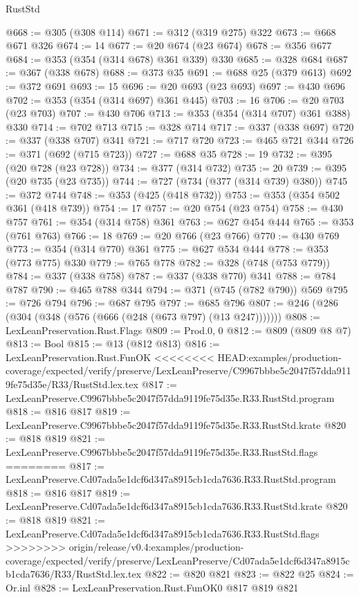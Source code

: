\begin{lexlean}{RustStd}
\begin{coremodule}
{\begin{coremodule}
{{{{{{{{@668 := @305 (@308 @114)
@671 := @312 (@319 @275) @322
@673 := @668 @671 @326
@674 := 14
@677 := @20 @674 (@23 @674)
@678 := @356 @677
@684 := @353 (@354 (@314 @678) @361 @339) @330
@685 := @328 @684
@687 := @367 (@338 @678)
@688 := @373 @35
@691 := @688 @25 (@379 @613)
@692 := @372 @691
@693 := 15
@696 := @20 @693 (@23 @693)
@697 := @430 @696
@702 := @353 (@354 (@314 @697) @361 @445)
@703 := 16
@706 := @20 @703 (@23 @703)
@707 := @430 @706
@713 := @353 (@354 (@314 @707) @361 @388) @330
@714 := @702 @713
@715 := @328 @714
@717 := @337 (@338 @697)
@720 := @337 (@338 @707) @341
@721 := @717 @720
@723 := @465 @721 @344
@726 := @371 (@692 (@715 @723))
@727 := @688 @35
@728 := 19
@732 := @395 (@20 @728 (@23 @728))
@734 := @377 (@314 @732)
@735 := 20
@739 := @395 (@20 @735 (@23 @735))
@744 := @727 (@734 (@377 (@314 @739) @380))
@745 := @372 @744
@748 := @353 (@425 (@418 @732))
@753 := @353 (@354 @502 @361 (@418 @739))
@754 := 17
@757 := @20 @754 (@23 @754)
@758 := @430 @757
@761 := @354 (@314 @758) @361
@763 := @627 @454 @444
@765 := @353 (@761 @763)
@766 := 18
@769 := @20 @766 (@23 @766)
@770 := @430 @769
@773 := @354 (@314 @770) @361
@775 := @627 @534 @444
@778 := @353 (@773 @775) @330
@779 := @765 @778
@782 := @328 (@748 (@753 @779))
@784 := @337 (@338 @758)
@787 := @337 (@338 @770) @341
@788 := @784 @787
@790 := @465 @788 @344
@794 := @371 (@745 (@782 @790)) @569
@795 := @726 @794
@796 := @687 @795
@797 := @685 @796
@807 := @246 (@286 (@304 (@348 (@576 (@666 (@248 (@673 @797) (@13 @247)))))))
@808 := LexLeanPreservation.Rust.Flags
@809 := Prod.{0, 0}
@812 := @809 (@809 @8 @7)
@813 := Bool
@815 := @13 (@812 @813)
@816 := LexLeanPreservation.Rust.FunOK
<<<<<<<< HEAD:examples/production-coverage/expected/verify/preserve/LexLeanPreserve/C9967bbbe5c2047f57dda9119fe75d35e/R33/RustStd.lex.tex
@817 := LexLeanPreserve.C9967bbbe5c2047f57dda9119fe75d35e.R33.RustStd.program
@818 := @816 @817
@819 := LexLeanPreserve.C9967bbbe5c2047f57dda9119fe75d35e.R33.RustStd.krate
@820 := @818 @819
@821 := LexLeanPreserve.C9967bbbe5c2047f57dda9119fe75d35e.R33.RustStd.flags
========
@817 := LexLeanPreserve.Cd07ada5e1dcf6d347a8915cb1cda7636.R33.RustStd.program
@818 := @816 @817
@819 := LexLeanPreserve.Cd07ada5e1dcf6d347a8915cb1cda7636.R33.RustStd.krate
@820 := @818 @819
@821 := LexLeanPreserve.Cd07ada5e1dcf6d347a8915cb1cda7636.R33.RustStd.flags
>>>>>>>> origin/release/v0.4:examples/production-coverage/expected/verify/preserve/LexLeanPreserve/Cd07ada5e1dcf6d347a8915cb1cda7636/R33/RustStd.lex.tex
@822 := @820 @821
@823 := @822 @25
@824 := Or.inl
@828 := LexLeanPreservation.Rust.FunOK0 @817 @819 @821
}}}}}}}}
\end{coremodule}}
\end{coremodule}
\end{lexlean}
